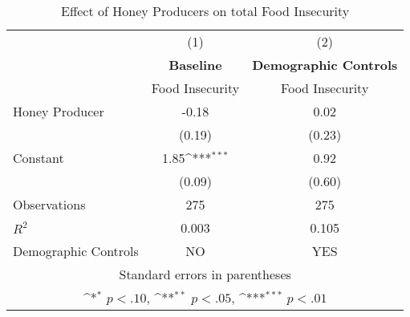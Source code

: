 \begin{table}[htbp]\centering \small
\def\sym#1{\ifmmode^{#1}\else\(^{#1}\)\fi}
\caption{Effect of Honey Producers on total Food Insecurity \label{insecurity_means}}
\begin{tabular}{l*{2}{c}}
\toprule
                    &\multicolumn{1}{c}{(1)}&\multicolumn{1}{c}{(2)}\\
                    &\multicolumn{1}{c}{  \textbf{Baseline}  }&\multicolumn{1}{c}{ \textbf{Demographic Controls}}\\
                    &Food Insecurity         &Food Insecurity         \\
\midrule
Honey Producer      &       -0.18         &        0.02         \\
                    &      (0.19)         &      (0.23)         \\
\addlinespace
Constant            &        1.85\sym{***}&        0.92         \\
                    &      (0.09)         &      (0.60)         \\
\midrule
Observations        &         275         &         275         \\
\(R^{2}\)           &       0.003         &       0.105         \\
Demographic Controls&          NO         &         YES         \\
\bottomrule
\multicolumn{3}{c}{\footnotesize Standard errors in parentheses}\\
\multicolumn{3}{c}{\footnotesize \sym{*} \(p<.10\), \sym{**} \(p<.05\), \sym{***} \(p<.01\)}\\
\end{tabular}
\end{table}
